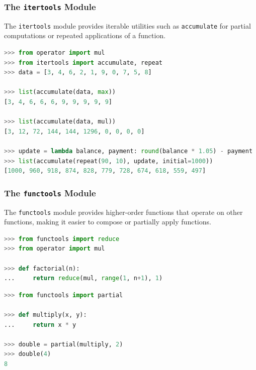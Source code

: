 \documentclass[envcountsect,10pt]{beamer}
\begin{document}
\begin{frame}[fragile]
    \frametitle{The \texttt{itertools} Module}
    
    The \texttt{itertools} module provides iterable utilities such as 
    \texttt{accumulate} for partial computations or repeated applications of a function. 

    \begin{lstlisting}[language=Python]
>>> from operator import mul
>>> from itertools import accumulate, repeat
>>> data = [3, 4, 6, 2, 1, 9, 0, 7, 5, 8]

>>> list(accumulate(data, max))
[3, 4, 6, 6, 6, 9, 9, 9, 9, 9]

>>> list(accumulate(data, mul))
[3, 12, 72, 144, 144, 1296, 0, 0, 0, 0]

>>> update = lambda balance, payment: round(balance * 1.05) - payment
>>> list(accumulate(repeat(90, 10), update, initial=1000))
[1000, 960, 918, 874, 828, 779, 728, 674, 618, 559, 497]
    \end{lstlisting}

\end{frame}

\begin{frame}[fragile]
    \frametitle{The \texttt{functools} Module}

    The \texttt{functools} module provides higher-order functions that operate on other functions,
    making it easier to compose or partially apply functions.

    \begin{lstlisting}[language=Python]
>>> from functools import reduce
>>> from operator import mul

>>> def factorial(n):
...     return reduce(mul, range(1, n+1), 1)
    \end{lstlisting}

    \begin{lstlisting}[language=Python]
>>> from functools import partial

>>> def multiply(x, y):
...     return x * y

>>> double = partial(multiply, 2)
>>> double(4)
8
    \end{lstlisting}


\end{frame}
\end{document}
